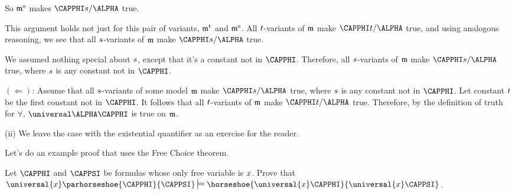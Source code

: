 \begin{PROOF}
So $\mathfrak{m^{\mathrm{s}}_{\mathrm{}}}$ makes $\CAPPHI\variable{s}/\ALPHA$ true.

This argument holds not just for this pair of variants, $\mathfrak{m^{\mathrm{t}}_{\mathrm{}}}$ and $\mathfrak{m^{\mathrm{s}}_{\mathrm{}}}$.  All $t$-variants of $\mathfrak{m}$ make $\CAPPHI\variable{t}/\ALPHA$ true, and using analogous reasoning, we see that all $s$-variants of $\mathfrak{m}$ make $\CAPPHI\variable{s}/\ALPHA$ true.

We assumed nothing special about $s$, except that it's a constant not in $\CAPPHI$.  Therefore, all $s$-variants of $\mathfrak{m}$ make $\CAPPHI\variable{s}/\ALPHA$ true, where $s$ is any constant not in $\CAPPHI$.

$(\Leftarrow)$:  Assume that all $s$-variants of some model $\mathfrak{m}$ make $\CAPPHI\variable{s}/\ALPHA$ true, where $s$ is any constant not in $\CAPPHI$.  Let constant $t$ be the first constant not in $\CAPPHI$.  It follows that all $t$-variants of $\mathfrak{m}$ make $\CAPPHI\variable{t}/\ALPHA$ true.  Therefore, by the definition of truth for $\forall$, $\universal\ALPHA\CAPPHI$ is true on $\mathfrak{m}$.

(ii) We leave the case with the existential quantifier as an exercise for the reader.
\end{PROOF}

Let's do an example proof that uses the Free Choice theorem.


\begin{majorILnc}{}
	Let $\CAPPHI$ and $\CAPPSI$ be formulas whose only free variable is $x$.  Prove that $\universal{\variable{x}}\parhorseshoe{\CAPPHI}{\CAPPSI}\sdtstile{}{}\horseshoe{\universal{\variable{x}}\CAPPHI}{\universal{\variable{x}}\CAPPSI}$.  
\end{majorILnc} 
 
